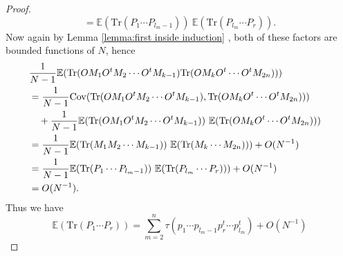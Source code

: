 \documentclass[10pt,a4paper]{amsart}
\newcommand{\Tr}{\mathrm{Tr}}
\newcommand{\cov}{\mathrm{Cov}}
\newcommand{\rE} {\mathbb{E}}
\begin{document}
\begin{proof}
\[\]
\[
=
\rE(\Tr( P_1 \cdots P_{l_m -1 }))\ \rE(\Tr( P_{l_m} \cdots P_{r})).
\]
Now again by Lemma \ref{lemma:first inside induction} , both
of these factors are bounded functions of $N$, hence
\begin{align*}\lefteqn{
\frac{1}{N - 1}
\rE( \Tr(O M_1 O^t M_2 \cdots O^t M_{k-1}) \Tr(O M_{k} O^t \cdots O^t M_{2n}) ))} \\
& =
\frac{1}{N - 1} \cov(\Tr(O M_1 O^t M_2 \cdots O^t M_{k-1}), 
                     \Tr(OM_{k} O^t \cdots O^t M_{2n}) )) \\
& \quad+
\frac{1}{N - 1} \rE(\Tr(O M_1 O^t M_2 \cdots O^t M_{k-1})) \
                 \rE(\Tr(O M_{k} O^t \cdots O^t M_{2n}) )) \\
& =
\frac{1}{N - 1} \rE(\Tr(M_1 M_2 \cdots M_{k-1})) \
                 \rE(\Tr(M_{k}  \cdots  M_{2n}) )) + O(N^{-1}) \\
&=
                 \frac{1}{N - 1} \rE(\Tr(P_1 \cdots P_{l_m-1})) \
                 \rE(\Tr(P_{l_m}  \cdots  P_{r}) )) + O(N^{-1}) \\
& = O(N^{-1}).
\end{align*}
Thus we have 
\[
\rE(\Tr(P_1 \cdots P_r))
=
\sum_{m=2}^n \tau(p_1 \cdots p_{l_m-1} p_r^t \cdots p_{l_m}^t ) + O(N^{-1})
\]
\end{proof} 
\end{document}

